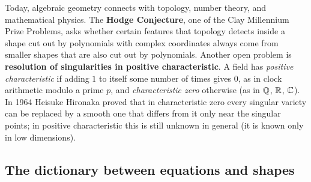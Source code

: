 \begin{historybox}
Today, algebraic geometry connects with topology, number theory, and mathematical physics. The \textbf{Hodge Conjecture}, one of the Clay Millennium Prize Problems, asks whether certain features that topology detects inside a shape cut out by polynomials with complex coordinates always come from smaller shapes that are also cut out by polynomials. Another open problem is \textbf{resolution of singularities in positive characteristic}. A field has \emph{positive characteristic} if adding $1$ to itself some number of times gives $0$, as in clock arithmetic modulo a prime $p$, and \emph{characteristic zero} otherwise (as in $\mathbb{Q}$, $\mathbb{R}$, $\mathbb{C}$). In 1964 Heisuke Hironaka proved that in characteristic zero every singular variety can be replaced by a smooth one that differs from it only near the singular points; in positive characteristic this is still unknown in general (it is known only in low dimensions).
\end{historybox}

\subsection{The dictionary between equations and shapes}

